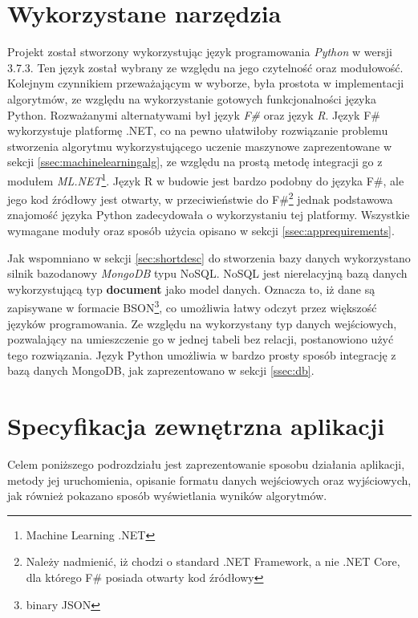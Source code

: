 \section{Wykorzystane narzędzia}
\label{sec:tools}
Projekt został stworzony wykorzystując język programowania \emph{Python} \cite{Python} w wersji 3.7.3. Ten język został wybrany ze względu na jego czytelność oraz modułowość. Kolejnym czynnikiem przeważającym w wyborze, była prostota w implementacji algorytmów, ze względu na wykorzystanie gotowych funkcjonalności języka Python. Rozważanymi alternatywami był język \emph{F\#} oraz język \emph{R}. Język F\# wykorzystuje platformę .NET, co na pewno ułatwiłoby rozwiązanie problemu stworzenia algorytmu wykorzystującego uczenie maszynowe zaprezentowane w sekcji \ref{ssec:machinelearningalg}, ze względu na prostą metodę integracji go z modułem \emph{ML.NET}\footnote{Machine Learning .NET}. Język R w budowie jest bardzo podobny do języka F\#, ale jego kod źródłowy jest otwarty, w przeciwieństwie do F\#\footnote{Należy nadmienić, iż chodzi o standard .NET Framework, a nie .NET Core, dla którego F\# posiada otwarty kod źródłowy} jednak podstawowa znajomość języka Python zadecydowała o wykorzystaniu tej platformy. Wszystkie wymagane moduły oraz sposób użycia opisano w sekcji \ref{ssec:apprequirements}.\par
Jak wspomniano w sekcji \ref{sec:shortdesc} do stworzenia bazy danych wykorzystano silnik bazodanowy \emph{MongoDB} typu NoSQL. NoSQL jest nierelacyjną bazą danych wykorzystującą typ \textbf{document} jako model danych. Oznacza to, iż dane są zapisywane w formacie BSON\footnote{binary JSON}, co umożliwia łatwy odczyt przez większość języków programowania. Ze względu na wykorzystany typ danych wejściowych, pozwalający na umieszczenie go w jednej tabeli bez relacji, postanowiono użyć tego rozwiązania. Język Python umożliwia w bardzo prosty sposób integrację z bazą danych MongoDB, jak zaprezentowano w sekcji \ref{ssec:db}.
\section{Specyfikacja zewnętrzna aplikacji}
Celem poniższego podrozdziału jest zaprezentowanie sposobu działania aplikacji, metody jej uruchomienia, opisanie formatu danych wejściowych oraz wyjściowych, jak również pokazano sposób wyświetlania wyników algorytmów.
